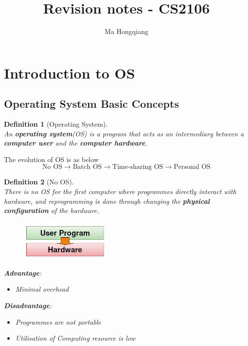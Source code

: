 \documentclass[12pt]{article}
\newtheorem{definition}{Definition}[section]
\theoremstyle{definition}
\begin{document}
\title{Revision notes - CS2106}
\author{Ma Hongqiang}
\maketitle
\tableofcontents

\clearpage
\section{Introduction to OS}
\subsection{Operating System Basic Concepts}
\begin{definition}[Operating System]
\hfill\\\normalfont An \textbf{operating system}(OS) is a program that acts as an intermediary between a \textbf{computer user} and the \textbf{computer hardware}.
\end{definition}
The evolution of OS is as below
\[
\text{No OS}\to\text{Batch OS}\to\text{Time-sharing OS}\to\text{Personal OS}
\]
\begin{definition}[No OS]
\hfill\\\normalfont There is no OS for the first computer where programmes \textit{directly} interact with hardware, and reprogramming is done through changing the \textbf{physical configuration} of the hardware.\\
\begin{figure}[h]
\centering
\includegraphics[width = 0.4\textwidth]{1_1.png}
\end{figure}
\textbf{Advantage}:
\begin{itemize}
  \item Minimal overhead
\end{itemize}
\textbf{Disadvantage}:
\begin{itemize}
  \item Programmes are not portable
  \item Utilisation of Computing resource is low
\end{itemize}
\end{definition}
\end{document}
